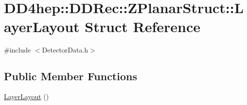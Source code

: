 \hypertarget{struct_d_d4hep_1_1_d_d_rec_1_1_z_planar_struct_1_1_layer_layout}{
\section{DD4hep::DDRec::ZPlanarStruct::LayerLayout Struct Reference}
\label{struct_d_d4hep_1_1_d_d_rec_1_1_z_planar_struct_1_1_layer_layout}
}


{\ttfamily \#include $<$DetectorData.h$>$}\subsection*{Public Member Functions}
\begin{DoxyCompactItemize}
\item 
\hyperlink{struct_d_d4hep_1_1_d_d_rec_1_1_z_planar_struct_1_1_layer_layout_ab128733c50738ce7dd0c00c44e16e57c}{LayerLayout} ()
\end{DoxyCompactItemize}
